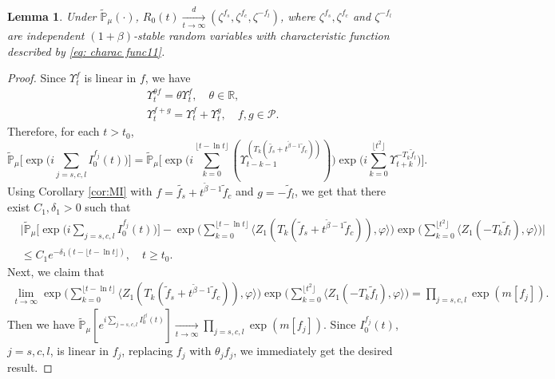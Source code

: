 \documentclass[12pt,a4paper]{amsart}
\theoremstyle{plain}
\newtheorem{lem}[thm]{Lemma}
\theoremstyle{definition}
\numberwithin{equation}{section}
\begin{document}
\begin{lem}\label{lem: U0T}
Under $\mathbb{\widetilde{P}}_{\mu}(\cdot)$,
 $R_0(t) \xrightarrow[t\to \infty]{d}(\zeta^{f_s},\zeta^{f_c},\zeta^{-f_l})$, where $\zeta^{f_s},\zeta^{f_c}$ and $\zeta^{-f_l}$ are independent $(1+\beta)$-stable random variables with characteristic function described by \eqref{eq: charac func11}.
\end{lem}
\begin{proof}
Since $\Upsilon_t^f$ is linear in $f$, we have
\begin{align}
&\Upsilon_t^{\theta f} = \theta \Upsilon_t^f, \quad \theta \in \mathbb R,\\
&\Upsilon_t^{f+g} = \Upsilon_t^f+\Upsilon_t^g,\quad f,g \in \mathcal P.
\end{align}
Therefore, for each $t>t_0$,
\[
\widetilde{\mathbb P}_{\mu}\Big[\exp\Big(i
\sum_{j=s,c,l}I_0^{f_j}(t)\Big)\Big]
= \widetilde{\mathbb P}_{\mu}\Big[\exp\Big(i\sum_{k=0}^{\lfloor t-\ln t \rfloor}(\Upsilon_{t-k-1}^{(T_k(\tilde{f_s}+t^{\tilde{\beta}-1} \tilde{f}_c))})\Big)\exp\Big(i\sum_{k=0}^{\lfloor t^2 \rfloor}\Upsilon_{t+k}^{-T_k\tilde{f}_l}\Big)\Big].
\]
Using Corollary \ref{cor:MI} with $f=\tilde{f_s}+t^{\tilde{\beta}-1} \tilde{f}_c$ and $g = -\tilde{f}_l$, we get that there exist $C_1,\delta_1 > 0$ such that
  \begin{align}
    &\Big|\widetilde{\mathbb P}_{\mu}\Big[\exp\Big(i
    \sum_{j=s,c,l}I_0^{f_j}(t)\Big)\Big]
    -\exp\Big(\sum_{k=0}^{\lfloor t-\ln t \rfloor} \langle Z_1(T_{k}(\tilde f_s+t^{\tilde{\beta}-1}\tilde{f}_c)), \varphi\rangle \Big)\exp\Big(\sum_{k=0}^{\lfloor t^2 \rfloor}\langle Z_1(-T_k\tilde{f}_l),\varphi\rangle\Big)\Big|\\
    &\leq C_1 e^{-\delta_1(t - \lfloor t - \ln t\rfloor)},
    \quad t\geq t_0.
  \end{align}
Next, we claim that
\begin{align}
\lim_{t\rightarrow\infty}\exp\Big(\sum_{k=0}^{\lfloor t-\ln t \rfloor} \langle Z_1(T_{k}(\tilde f_s+t^{\tilde{\beta}-1}\tilde{f}_c)), \varphi\rangle \Big)\exp\Big(\sum_{k=0}^{\lfloor t^2 \rfloor}\langle Z_1(-T_k\tilde{f}_l),\varphi\rangle\Big) =
\prod_{j=s,c,l}\exp(m[f_j]).
\end{align}
 Then we have
 $\mathbb{\widetilde{P}}_{\mu} [e^{i \sum_{j=s,c,l}I^{f^j}_0(t)} ]
 \xrightarrow[t\to \infty]{}  \prod_{j=s,c,l}\exp(m[f_j])$.
Since $I_0^{f_j}(t)$, $j=s,c,l$, is linear in $f_j$, replacing $f_j$ with $\theta_j f_j$, we immediately get the desired result.


\end{proof}
\end{document}
